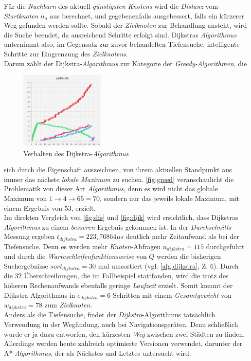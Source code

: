 \documentclass[12pt]{article}
\begin{document}
\noindent Für die \textit{Nachbarn} des aktuell \textit{günstigsten Knotens} wird die \textit{Distanz} vom \textit{Startknoten} $n_a$ aus berechnet, und gegebenenfalls ausgebessert, falls ein kürzerer Weg gefunden werden sollte. Sobald der \textit{Zielknoten} zur Behandlung ansteht, wird die Suche beendet, da ausreichend Schritte erfolgt sind. Dijkstras \textit{Algorithmus} unternimmt also, im Gegensatz zur zuvor behandelten Tiefensuche, intelligente Schritte zur Eingrenzung des \textit{Zielknotens}. 
\\
Darum zählt der Dijkstra-\textit{Algorithmus} zur Kategorie der \textit{Greedy-Algorithmen}, die
\begin{figure}
\vspace{-20pt}
\begin{center}
\includegraphics[width=0.375\textwidth]{res/dijk_timeV2.png}
\end{center}
\vspace{-30pt}
\centering
\caption{Verhalten des Dijkstra-\textit{Algorithmus}}
\label{fig:dijk-time}
\end{figure}

\noindent sich durch die Eigenschaft auszeichnen, von ihrem aktuellen Standpunkt aus immer das  nächste \textit{lokale Maximum} zu suchen. \autoref{fig:greed} veranschaulicht die Problematik von dieser Art \textit{Algorithmus}, denn es wird nicht das globale Maximum von $1 \to 4 \to 65 = 70$, sondern nur das jeweils lokale Maximum, mit einem Ergebnis von 53, erzielt.
\\
Im direkten Vergleich von \autoref{fig:dfs} und \autoref{fig:dijk} wird ersichtlich, dass Dijkstras \textit{Algorithmus} zu einem \textit{besseren} Ergebnis gekommen ist. In der \textit{Durchschnitts}-Messung ergeben $t_{dijkstra} = 223,76864\mu s$ deutlich mehr Zeitaufwand als bei der Tiefensuche. Denn es werden mehr \textit{Knoten}-Abfragen $n_{dijkstra} = 115$ durchgeführt und durch die \textit{Warteschleifenfunktionsweise} von $Q$ werden die bisherigen Suchergebnisse $sort_{dijkstra} = 30$ mal umsortiert (vgl. \autoref{alg:dijkstra}, Z. 6). Durch die $32$ Überschreibungen, die im Fallbeispiel stattfanden, wird die trotz des höheren Rechenaufwands ebenfalls geringe \textit{Laufzeit} erzielt. Somit kommt der Dijkstra-Algorithmus in $e_{dijkstra} = 6$ Schritten mit einem \textit{Gesamtgewicht} von $w_{dijkstra} = 78$ zum \textit{Zielknoten}.
\\
Anders als die Tiefensuche, findet der \textit{Dijkstra}-Algorithmus tatsächlich Verwendung in der Wegfindung, auch bei Navigationsgeräten. Denn schließlich wurde er ja dazu entworfen, den kürzesten \textit{Weg} zwischen zwei Städten zu finden. Allerdings werden heute zahlreich optimierte Versionen verwendet, darunter der A*-\textit{Algorithmus}, der als Nächstes und Letztes untersucht wird.
\end{document}
